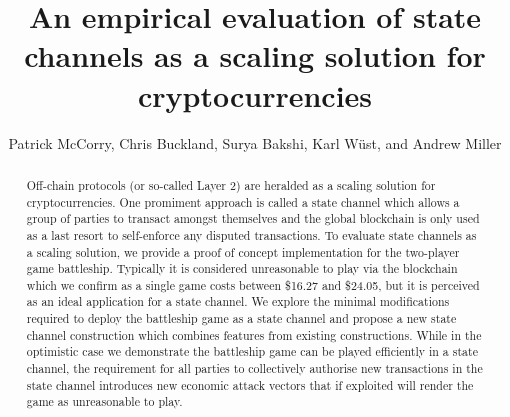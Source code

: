 \documentclass{llncs}
\begin{document}
	\title{An empirical evaluation of state channels as a scaling solution for cryptocurrencies}
	
	
	\author{Patrick McCorry, Chris Buckland,
		Surya Bakshi, Karl W\"ust, and Andrew Miller }
	

	\maketitle
	\begin{abstract}
		 Off-chain protocols (or so-called Layer 2) are heralded as a scaling solution for cryptocurrencies.
		 One promiment approach is called a state channel which allows a group of parties to transact amongst themselves and the global blockchain is only used as a last resort to self-enforce any disputed transactions. 
		 To evaluate state channels as a scaling solution, we provide a proof of concept implementation for the two-player game battleship.
		 Typically it is considered unreasonable to play via the blockchain which we confirm as a single game costs between \$16.27 and \$24.05, but it is perceived as an ideal application for a state channel. 
		 We explore the minimal modifications required to deploy the battleship game as a state channel and propose a new state channel construction which combines features from existing constructions. 
		 While in the optimistic case we demonstrate the battleship game can be played efficiently in a state channel, the requirement for all parties to collectively authorise new transactions in the state channel introduces new economic attack vectors that if exploited will render the game as unreasonable to play. 
	\end{abstract} 
\end{document}
